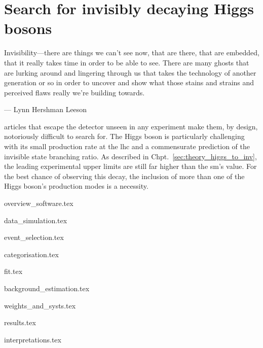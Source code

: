 \chapter{Search for invisibly decaying Higgs bosons}
\label{chap:higgstoinv}

\epigraph{Invisibility---there are things we can't see now, that are there, that are embedded, that it really takes time in order to be able to see. There are many ghosts that are lurking around and lingering through us that takes the technology of another generation or so in order to uncover and show what those stains and strains and perceived flaws really we're building towards.}{--- Lynn Hershman Leeson}

articles that escape the detector unseen in any experiment make them, by design, notoriously difficult to search for. The Higgs boson is particularly challenging with its small production rate at the \acrshort{lhc} and a commensurate prediction of the invisible state branching ratio. As described in Chpt.~\ref{sec:theory_higgs_to_inv}, the leading experimental upper limits are still far higher than the \acrlong{sm}'s value. For the best chance of observing this decay, the inclusion of more than one of the Higgs boson's production modes is a necessity.




{overview_software.tex}




{data_simulation.tex}




{event_selection.tex}




{categorisation.tex}




{fit.tex}




{background_estimation.tex}




{weights_and_systs.tex}




{results.tex}




{interpretations.tex}
